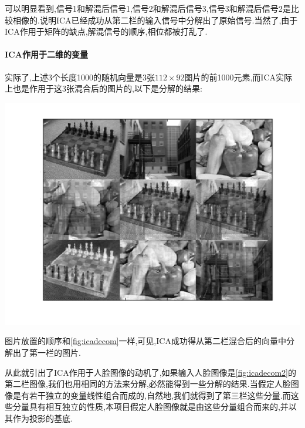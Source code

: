 可以明显看到,信号1和解混后信号1,信号2和解混后信号3,信号3和解混后信号2是比较相像的.说明ICA已经成功从第二栏的输入信号中分解出了原始信号.当然了,由于ICA作用于矩阵的缺点,解混信号的顺序,相位都被打乱了.
\paragraph{ICA作用于二维的变量}
实际了,上述3个长度1000的随机向量是3张$112 \times 92$图片的前1000元素,而ICA实际上也是作用于这3张混合后的图片的,以下是分解的结果:

\begin{center}
\begin{minipage}[t]{\linewidth}
\center
{
\includegraphics[width=\textwidth]{Img/ica_decom2.png} 
	\label{fig:icadecom2}
}
\end{minipage}
\medskip
\end{center}
图片放置的顺序和\ref{fig:icadecom}一样,可见,ICA成功得从第二栏混合后的向量中分解出了第一栏的图片.\newline

从此就引出了ICA作用于人脸图像的动机了,如果输入人脸图像是\ref{fig:icadecom2}的第二栏图像,我们也用相同的方法来分解,必然能得到一些分解的结果.当假定人脸图像是有若干独立的变量线性组合而成的,自然地,我们就得到了第三栏这些分量.而这些分量具有相互独立的性质,本项目假定人脸图像就是由这些分量组合而来的,并以其作为投影的基底.


